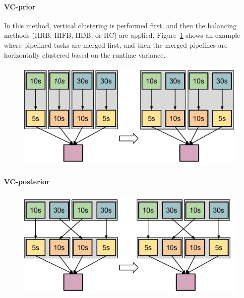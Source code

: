 \paragraph{\textbf{VC-prior}}
In this method, vertical clustering is performed first, and then the balancing methods (HRB, HIFB, HDB, or HC) are applied. Figure~\ref{fig:imbalance_vc_prior} shows an example where pipelined-tasks are merged first, and then the merged pipelines are horizontally clustered based on the runtime variance.

\begin{figure}[!htb]
	\centering
	\includegraphics[width=0.75\linewidth]{figures/balance/figure12.pdf}
	\label{fig:imbalance_vc_prior}
\end{figure}

\paragraph{\textbf{VC-posterior}} 

\begin{figure}[!htb]
	\centering
	\includegraphics[width=0.75\linewidth]{figures/balance/figure13.pdf}
	\label{fig:imbalance_vc_posterior}
\end{figure}

